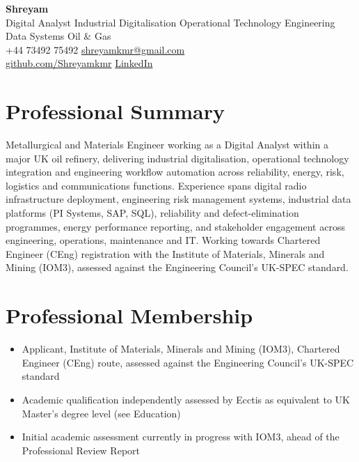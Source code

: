 \documentclass[11pt,a4paper]{article}
\begin{document}
\begin{center}
    {\Huge \bfseries Shreyam}\\[4pt]
    Digital Analyst \textbar{} Industrial Digitalisation \textbar{} Operational
    Technology \textbar{} Engineering Data Systems \textbar{} Oil \& Gas \\[4pt]
    +44 73492 75492 \textbar{}
    \href{mailto:shreyamkmr@gmail.com}{shreyamkmr@gmail.com} \\
    \href{https://github.com/Shreyamkmr}{github.com/Shreyamkmr} \textbar{}
    \href{https://www.linkedin.com/in/shreyamiitkgp/}{LinkedIn}
\end{center}

\section*{Professional Summary}
Metallurgical and Materials Engineer working as a Digital Analyst within a
major UK oil refinery, delivering industrial digitalisation, operational
technology integration and engineering workflow automation across
reliability, energy, risk, logistics and communications functions. Experience
spans digital radio infrastructure deployment, engineering risk management
systems, industrial data platforms (PI Systems, SAP, SQL), reliability and
defect-elimination programmes, energy performance reporting, and
stakeholder engagement across engineering, operations, maintenance and IT.
Working towards Chartered Engineer (CEng) registration with the Institute of
Materials, Minerals and Mining (IOM3), assessed against the Engineering
Council's UK-SPEC standard.

\section*{Professional Membership}
\begin{itemize}
    \item Applicant, Institute of Materials, Minerals and Mining (IOM3),
          Chartered Engineer (CEng) route, assessed against the Engineering
          Council's UK-SPEC standard
    \item Academic qualification independently assessed by Ecctis as
          equivalent to UK Master's degree level (see Education)
    \item Initial academic assessment currently in progress with IOM3, ahead
          of the Professional Review Report
\end{itemize}
\end{document}

